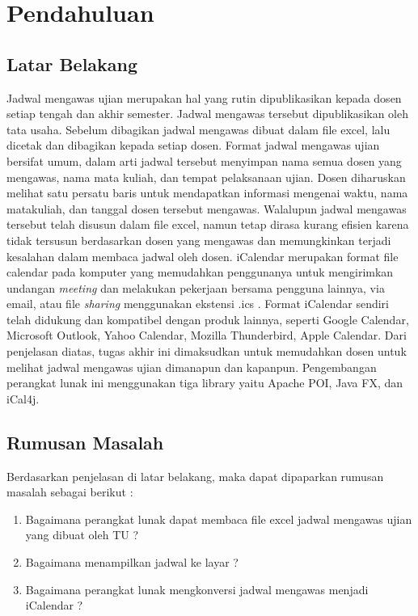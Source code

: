 \chapter{Pendahuluan}
\label{chap:pendahuluan}

\section{Latar Belakang}
\label{sec:latar_belakang}

\indent Jadwal mengawas ujian merupakan hal yang rutin dipublikasikan kepada dosen setiap tengah dan akhir semester. Jadwal mengawas tersebut dipublikasikan oleh tata usaha. Sebelum dibagikan jadwal mengawas dibuat dalam file excel, lalu dicetak dan dibagikan kepada setiap dosen. Format jadwal mengawas ujian bersifat umum, dalam arti jadwal tersebut menyimpan nama semua dosen yang mengawas, nama mata kuliah, dan tempat pelaksanaan ujian. Dosen diharuskan melihat satu persatu baris untuk mendapatkan informasi mengenai waktu, nama matakuliah, dan tanggal dosen tersebut mengawas. Walalupun jadwal mengawas tersebut telah disusun dalam file excel, namun tetap dirasa kurang efisien karena tidak tersusun berdasarkan dosen yang mengawas dan memungkinkan terjadi kesalahan dalam membaca jadwal oleh dosen. 
iCalendar merupakan format file calendar pada komputer yang memudahkan penggunanya untuk mengirimkan undangan \textit{meeting} dan melakukan pekerjaan bersama pengguna lainnya, via email, atau file \textit{sharing} menggunakan ekstensi .ics . Format iCalendar sendiri telah didukung dan kompatibel dengan produk lainnya, seperti Google Calendar, Microsoft Outlook, Yahoo Calendar, Mozilla Thunderbird, Apple Calendar.
Dari penjelasan diatas, tugas akhir ini dimaksudkan untuk memudahkan dosen untuk melihat jadwal mengawas ujian dimanapun dan kapanpun. Pengembangan perangkat lunak ini menggunakan tiga library yaitu Apache POI, Java FX, dan iCal4j.    

\section{Rumusan Masalah}
\label{sec:rumusan_masalah}

Berdasarkan penjelasan di latar belakang, maka dapat dipaparkan rumusan masalah sebagai berikut :
\begin{enumerate}
	\item Bagaimana perangkat lunak dapat membaca file excel jadwal mengawas ujian yang dibuat oleh TU ?
	\item Bagaimana menampilkan jadwal ke layar ?
	\item Bagaimana perangkat lunak mengkonversi jadwal mengawas menjadi iCalendar ? 
\end{enumerate}

